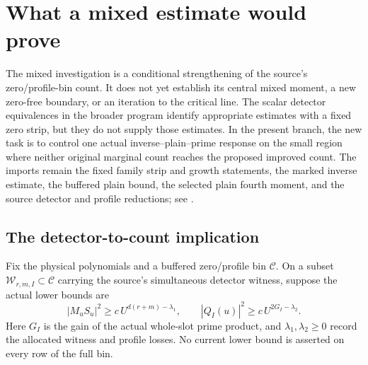 \documentclass[11pt]{article}
\theoremstyle{definition}
\begin{document}


\section{What a mixed estimate would prove}
\label{sec:mixed-logical-payoff}

The mixed investigation is a conditional strengthening of the source's
zero/profile-bin count.  It does not yet establish its central mixed moment,
a new zero-free boundary, or an iteration to the critical line.  The scalar
detector equivalences in the broader program identify appropriate estimates
with a fixed zero strip, but they do not supply those estimates.  In the
present branch, the new task is to control one actual inverse--plain--prime
response on the small region where neither original marginal count reaches
the proposed improved count.  The imports remain the fixed family strip and
growth statements, the marked inverse estimate, the buffered plain bound,
the selected plain fourth moment, and the source detector and profile
reductions; see \cite{amplification,n1,n2,n3,df}.

\subsection{The detector-to-count implication}

Fix the physical polynomials and a buffered zero/profile bin
\(\mathcal C\).  On a subset \(\mathcal W_{r,m,I}\subset\mathcal C\)
carrying the source's simultaneous detector witness, suppose the actual
lower bounds are
\begin{equation}
 |M_uS_u|^2\ge c\,U^{d(r+m)-\lambda_1},\qquad
 |Q_I(u)|^2\ge c\,U^{2G_I-\lambda_2}.
 \label{eq:actual-witness-lower}
\end{equation}
Here \(G_I\) is the gain of the actual whole-slot prime product, and
\(\lambda_1,\lambda_2\ge0\) record the allocated witness and profile
losses.  No current lower bound is asserted on every row of the full bin.
\end{document}
